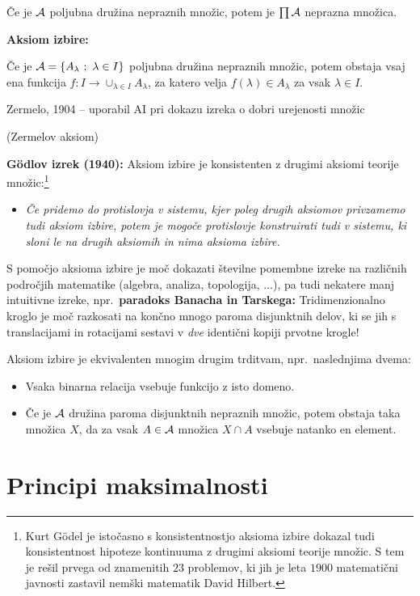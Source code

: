 \documentclass[11pt,paper=b5,footinclude,headinclude]{scrbook} %
\begin{document}
Če je ${\cal A}$ poljubna družina nepraznih množic, potem je $\prod {\cal A}$ neprazna množica.

\bigskip
\textbf{Aksiom izbire:}

Če je ${\cal A} = \{A_\lambda~;~\lambda\in I\}$ poljubna družina nepraznih množic,
potem obstaja vsaj ena funkcija $f:I\to \cup_{\lambda \in I}A_\lambda$, za katero velja
$f(\lambda)\in A_\lambda$ za vsak $\lambda\in I$.

Zermelo, 1904 -- uporabil AI pri dokazu izreka o dobri urejenosti množic

(Zermelov aksiom)


\bigskip

\textbf{G\"odlov izrek (1940):} Aksiom izbire je konsistenten z drugimi aksiomi teorije množic:\footnote{Kurt G\"odel je istočasno s konsistentnostjo aksioma izbire dokazal tudi konsistentnost hipoteze kontinuuma z drugimi aksiomi teorije množic. S tem je rešil prvega od znamenitih $23$ problemov, ki jih je leta $1900$ matematični javnosti zastavil
nemški matematik David Hilbert.}
\begin{itemize}
  \item \emph{ Če pridemo do protislovja v sistemu, kjer poleg drugih aksiomov privzamemo tudi aksiom izbire, potem je mogoče protislovje konstruirati tudi v sistemu, ki sloni le na drugih aksiomih in nima aksioma izbire.}
\end{itemize}

\bigskip
S pomočjo aksioma izbire je moč dokazati številne pomembne izreke na različnih področjih matematike (algebra, analiza, topologija, $\ldots$), pa tudi nekatere manj intuitivne izreke, npr.~\textbf{paradoks Banacha in Tarskega:} Tridimenzionalno kroglo je moč razkosati na končno mnogo paroma disjunktnih delov, ki se jih s translacijami in rotacijami sestavi v {\em dve} identični kopiji prvotne krogle!

\bigskip
Aksiom izbire je ekvivalenten mnogim drugim trditvam, npr.~naslednjima dvema:
\begin{itemize}
  \item Vsaka binarna relacija vsebuje funkcijo z isto domeno.
  \item Če je ${\cal A}$ družina paroma disjunktnih nepraznih množic, potem obstaja taka  množica $X$, da za vsak $A\in {\cal A}$ množica $X\cap A$ vsebuje natanko en element.
\end{itemize}


\section{Principi maksimalnosti}
\end{document}
